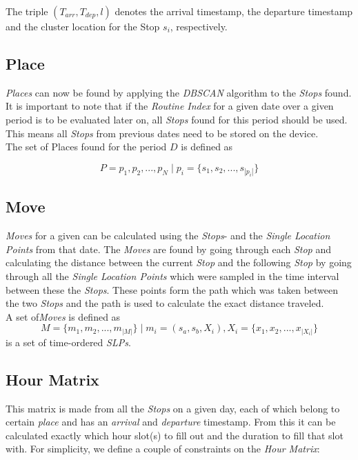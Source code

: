The triple $(T_{arr}, T_{dep}, l)$ denotes the arrival timestamp, the departure timestamp and the cluster location for the Stop $s_i$, respectively.

\subsection{Place}
\textit{Places} can now be found by applying the \textit{DBSCAN} algorithm to the \textit{Stops} found. It is important to note that if the \textit{Routine Index} for a given date over a given period is to be evaluated later on, all \textit{Stops} found for this period should be used. This means all \textit{Stops} from previous dates need to be stored on the device. \\

The set of Places found for the period $D$ is defined as 

$$P = {p_1, p_2, ..., p_N} \;|\; p_i = \{s_1, s_2, ..., s_{|p_i|}\}$$

\subsection{Move}
\textit{Moves} for a given can be calculated using the \textit{Stops}- and the \textit{Single Location Points} from that date. The \textit{Moves} are found by going through each \textit{Stop} and calculating the distance between the current \textit{Stop} and the following \textit{Stop} by going through all the \textit{Single Location Points} which were sampled in the time interval between these the \textit{Stops}. These points form the path which was taken between the two \textit{Stops} and the path is used to calculate the exact distance traveled.\\

A set of\textit{Moves} is defined as $$M = \{m_1, m_2, ..., m_{|M|}\} \;| \; m_i = (s_a, s_b, X_i), X_i = \{x_1, x_2, ..., x_{|X_i|}\}$$ is a set of time-ordered \textit{SLPs}.\\

\subsection{Hour Matrix}
This matrix is made from all the \textit{Stops} on a given day, each of which belong to certain \textit{place} and has an \textit{arrival} and \textit{departure} timestamp. From this it can be calculated exactly which hour slot(s) to fill out and the duration to fill that slot with. For simplicity, we define a couple of constraints on the \textit{Hour Matrix}:

